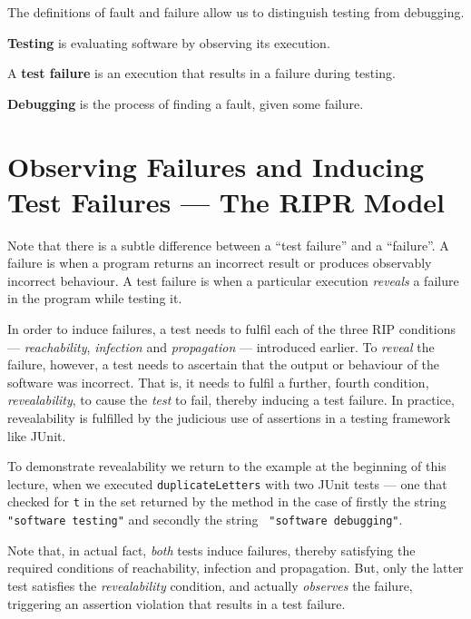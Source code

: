 
The definitions of fault and failure allow us to distinguish testing from
debugging. 

{\bf Testing} is evaluating software by observing its execution.

A {\bf test failure} is an execution that results in a failure during testing.

{\bf Debugging} is the process of finding a fault, given some failure.

\section{Observing Failures and Inducing Test Failures --- The RIPR Model}

Note that there is a subtle difference between a ``test failure'' and a
``failure''. A failure is when a program returns an incorrect result or produces
observably incorrect behaviour. A test failure is when a particular execution
{\it reveals} a failure in the program while testing it. 


In order to induce failures, a test needs to fulfil each of the three RIP
conditions --- {\it reachability}, {\it infection} and {\it propagation} ---
introduced earlier. To {\it reveal} the failure, however, a test needs to
ascertain that the output or behaviour of the software was incorrect. That is,
it needs to fulfil a further, fourth condition, {\it revealability}, to cause
the {\it test} to fail, thereby inducing a test failure. In practice,
revealability is fulfilled by the judicious use of assertions in a testing
framework like JUnit. 


To demonstrate revealability we return to the example at the beginning of this
lecture, when we executed {\tt duplicateLetters} with two JUnit tests --- one
that checked for {\tt t} in the set returned by the method in the case of
firstly the string {\tt "software testing"} and secondly the string {\tt
"software debugging"}.

Note that, in actual fact, {\it both} tests induce failures, thereby satisfying
the required conditions of reachability, infection and propagation. But, only
the latter test satisfies the {\it revealability} condition, and actually {\it
observes} the failure, triggering an assertion violation that results in a test
failure. 

